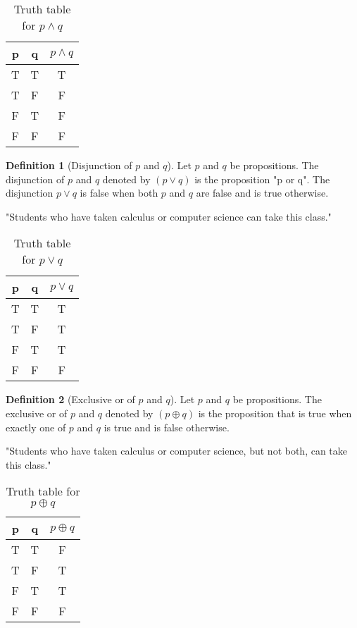 \documentclass[12pt,oneside,a4paper]{book}
\theoremstyle{remark}
\theoremstyle{definition}
\newtheorem{defn}{Definition}
\begin{document}
\begin{table}[H]
    \centering
    \begin{tabular}{|c|c|c|}
        \hline
        p & q & \(p\wedge q\) \\ \hline
        T & T & T             \\ \hline
        T & F & F             \\ \hline
        F & T & F             \\ \hline
        F & F & F             \\ \hline
    \end{tabular}
    \caption{Truth table for \(p\wedge q\)}
\end{table}
\begin{defn}[Disjunction of \(p\) and \(q\)]
    Let \(p\) and \(q\) be propositions. The disjunction of \(p\) and \(q\) denoted by \((p \vee q)\) is the proposition "p or q". The disjunction \(p\vee q\) is false when both \(p\) and \(q\) are false and is true otherwise.
\end{defn}
"Students who have taken calculus or computer science can take this class."
\begin{table}[H]
    \centering
    \begin{tabular}{|c|c|c|}
        \hline
        p & q & \(p\vee q\) \\ \hline
        T & T & T           \\ \hline
        T & F & T           \\ \hline
        F & T & T           \\ \hline
        F & F & F           \\ \hline
    \end{tabular}
    \caption{Truth table for \(p\vee q\)}
\end{table}
\begin{defn}[Exclusive or of \(p\) and \(q\)]
    Let \(p\) and \(q\) be propositions. The exclusive or of \(p\) and \(q\) denoted by \((p \oplus q)\) is the proposition that is true when exactly one of \(p\) and \(q\) is true and is false otherwise.
\end{defn}
"Students who have taken calculus or computer science, but not both, can take this class."
\begin{table}[H]
    \centering
    \begin{tabular}{|c|c|c|}
        \hline
        p & q & \(p\oplus q\) \\ \hline
        T & T & F             \\ \hline
        T & F & T             \\ \hline
        F & T & T             \\ \hline
        F & F & F             \\ \hline
    \end{tabular}
    \caption{Truth table for \(p\oplus q\)}
\end{table}
\end{document}
